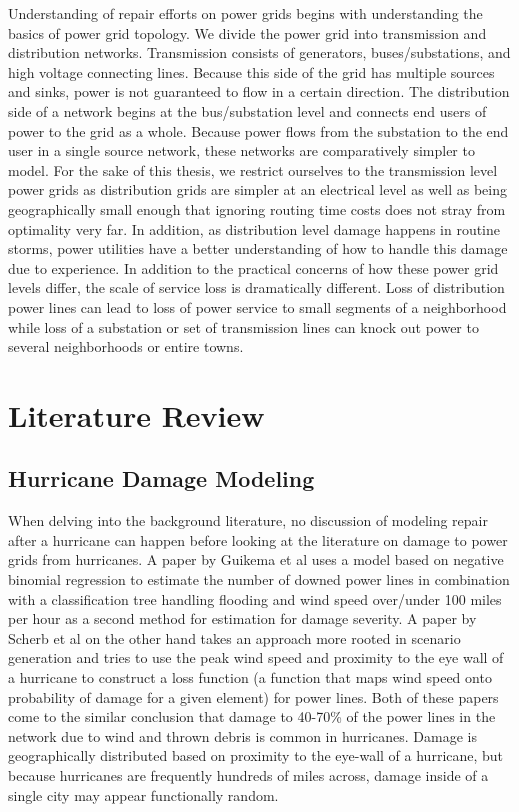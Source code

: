 \documentclass{article}
\begin{document}
	Understanding of repair efforts on power grids begins with understanding the basics of power grid topology. We divide the power grid into transmission and distribution networks. Transmission consists of generators, buses/substations, and high voltage connecting lines. Because this side of the grid has multiple sources and sinks, power is not guaranteed to flow in a certain direction. The distribution side of a network begins at the bus/substation level and connects end users of power to the grid as a whole. Because power flows from the substation to the end user in a single source network, these networks are comparatively simpler to model. For the sake of this thesis, we restrict ourselves to the transmission level power grids as distribution grids are simpler at an electrical level as well as being geographically small enough that ignoring routing time costs does not stray from optimality very far. In addition, as distribution level damage happens in routine storms, power utilities have a better understanding of how to handle this damage due to experience. In addition to the practical concerns of how these power grid levels differ, the scale of service loss is dramatically different. Loss of distribution power lines can lead to loss of power service to small segments of a neighborhood while loss of a substation or set of transmission lines can knock out power to several neighborhoods or entire towns.
	
	
	\section{Literature Review}
	\subsection{Hurricane Damage Modeling}
		When delving into the background literature, no discussion of modeling repair after a hurricane can happen before looking at the literature on damage to power grids from hurricanes. A paper by Guikema et al\cite{GuikemaEA2010} uses a model based on negative binomial regression to estimate the number of downed power lines in combination with a classification tree handling flooding and wind speed over/under 100 miles per hour as a second method for estimation for damage severity. A paper by Scherb et al \cite{ScherbEA2015} on the other hand takes an approach more rooted in scenario generation and tries to use the peak wind speed and proximity to the eye wall of a hurricane to construct a loss function (a function that maps wind speed onto probability of damage for a given element) for power lines. Both of these papers come to the similar conclusion that damage to 40-70\% of the power lines in the network due to wind and thrown debris is common in hurricanes. Damage is geographically distributed based on proximity to the eye-wall of a hurricane, but because hurricanes are frequently hundreds of miles across, damage inside of a single city may appear functionally random. 
		
\end{document}
